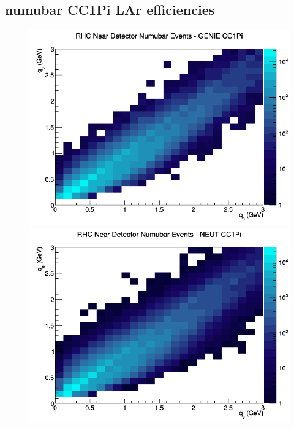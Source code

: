 \subsection{numubar CC1Pi LAr efficiencies}
\begin{figure}[h]
\includegraphics[width=\linewidth]{eff_q0_q3/LAr/CC1Pi_RHC_ND_numubar_q3_q0_GENIE.png}
\endminipage
{}
\includegraphics[width=\linewidth]{eff_q0_q3/LAr/CC1Pi_RHC_ND_numubar_q3_q0_NEUT.png}
\endminipage
{}

\end{figure}
